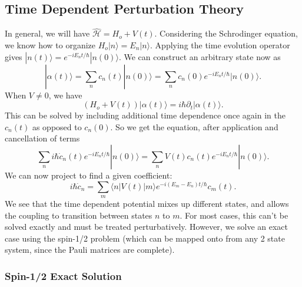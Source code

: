\documentclass[fontsize=12pt]{scrartcl}
\newcommand{\ptl}{\partial}
\newcommand{\la}{\langle}
\newcommand{\ra}{\rangle}
\newcommand{\Ham}{\hat{\mathcal{H}}}
\begin{document}
\subsection{Time Dependent Perturbation Theory}

In general, we will have $\Ham=H_o+V(t)$. Considering the Schrodinger equation, we know how to organize $H_o|n\ra=E_n|n\ra$. Applying the time evolution operator gives $|n(t)\ra = e^{-iE_nt/\hbar}|n(0)\ra.$ We can construct an arbitrary state now as $$|\alpha(t)\ra = \sum_n c_n(t)|n(0)\ra = \sum_n c_n(0)e^{-iE_nt/\hbar}|n(0)\ra.$$ When $V\neq 0$, we have $$(H_o+V(t))|\alpha(t)\ra = i\hbar\ptl_t|\alpha(t)\ra.$$ This can be solved by including additional time dependence once again in the $c_n(t)$ as opposed to $c_n(0)$. So we get the equation, after application and cancellation of terms $$\sum_n i\hbar \dot{c}_n(t)e^{-iE_nt/\hbar}|n(0)\ra = \sum_n V(t)c_n(t)e^{-iE_nt/\hbar}|n(0)\ra.$$ We can now project to find a given coefficient: $$i\hbar \dot{c}_n = \sum_m \la n|V(t)|m\ra e^{-i(E_m-E_n)t/\hbar}c_m(t).$$ We see that the time dependent potential mixes up different states, and allows the coupling to transition between states $n$ to $m$. For most cases, this can't be solved exactly and must be treated perturbatively. However, we solve an exact case using the spin-1/2 problem (which can be mapped onto from any 2 state system, since the Pauli matrices are complete). 

\subsubsection{Spin-1/2 Exact Solution}
\end{document}
